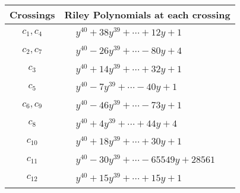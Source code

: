 \documentclass[1p]{elsarticle_modified}
\theoremstyle{definition}
\begin{document}
\begin{tabular}{m{50pt}|m{274pt}}
Crossings & \hspace{64pt}Riley Polynomials at each crossing \\
\hline $$\begin{aligned}c_{1},c_{4}\end{aligned}$$&$\begin{aligned}
&y^{40}+38 y^{39}+\cdots+12 y+1
\end{aligned}$\\
\hline $$\begin{aligned}c_{2},c_{7}\end{aligned}$$&$\begin{aligned}
&y^{40}-26 y^{39}+\cdots-80 y+4
\end{aligned}$\\
\hline $$\begin{aligned}c_{3}\end{aligned}$$&$\begin{aligned}
&y^{40}+14 y^{39}+\cdots+32 y+1
\end{aligned}$\\
\hline $$\begin{aligned}c_{5}\end{aligned}$$&$\begin{aligned}
&y^{40}-7 y^{39}+\cdots-40 y+1
\end{aligned}$\\
\hline $$\begin{aligned}c_{6},c_{9}\end{aligned}$$&$\begin{aligned}
&y^{40}-46 y^{39}+\cdots-73 y+1
\end{aligned}$\\
\hline $$\begin{aligned}c_{8}\end{aligned}$$&$\begin{aligned}
&y^{40}+4 y^{39}+\cdots+44 y+4
\end{aligned}$\\
\hline $$\begin{aligned}c_{10}\end{aligned}$$&$\begin{aligned}
&y^{40}+18 y^{39}+\cdots+30 y+1
\end{aligned}$\\
\hline $$\begin{aligned}c_{11}\end{aligned}$$&$\begin{aligned}
&y^{40}-30 y^{39}+\cdots-65549 y+28561
\end{aligned}$\\
\hline $$\begin{aligned}c_{12}\end{aligned}$$&$\begin{aligned}
&y^{40}+15 y^{39}+\cdots+15 y+1
\end{aligned}$\\
\hline
\end{tabular}\\~\\
\end{document}
